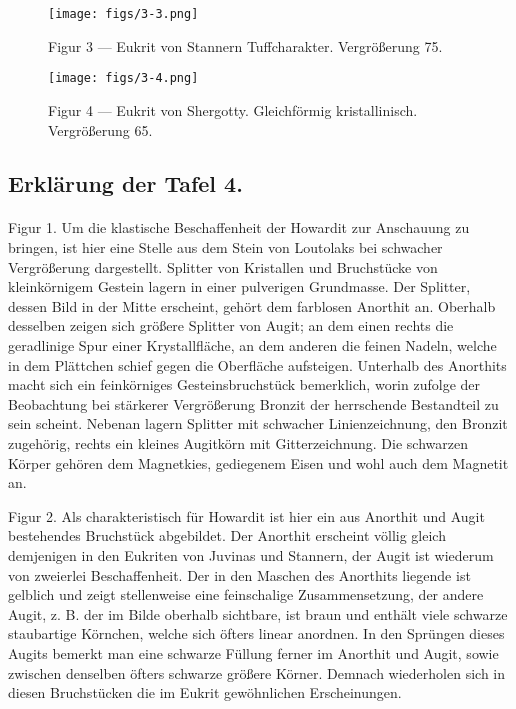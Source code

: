 \documentclass[a4paper, 12pt, oneside]{article}
\begin{document}
\vspace*{\fill}
\begin{figure}[H]
\centering
\texttt{[image: figs/3-3.png]}
\caption{\small Figur 3 --- Eukrit von Stannern Tuffcharakter. Vergrößerung 75.}
\end{figure}
\vspace*{\fill}
\clearpage

\vspace*{\fill}
\begin{figure}[H]
\centering
\texttt{[image: figs/3-4.png]}
\caption{\small Figur 4 --- Eukrit von Shergotty. Gleichförmig kristallinisch. Vergrößerung 65.}
\end{figure}
\vspace*{\fill}
\clearpage

\subsection{Erklärung der Tafel 4.}
\paragraph{}
Figur 1. Um die klastische Beschaffenheit der Howardit zur Anschauung zu bringen, ist hier eine Stelle aus dem Stein von Loutolaks bei schwacher Vergrößerung dargestellt. Splitter von Kristallen und Bruchstücke von kleinkörnigem Gestein lagern in einer pulverigen Grundmasse. Der Splitter, dessen Bild in der Mitte erscheint, gehört dem farblosen Anorthit an. Oberhalb desselben zeigen sich größere Splitter von Augit; an dem einen rechts die geradlinige Spur einer Krystallfläche, an dem anderen die feinen Nadeln, welche in dem Plättchen schief gegen die Oberfläche aufsteigen. Unterhalb des Anorthits macht sich ein feinkörniges Gesteinsbruchstück bemerklich, worin zufolge der Beobachtung bei stärkerer Vergrößerung Bronzit der herrschende Bestandteil zu sein scheint. Nebenan lagern Splitter mit schwacher Linienzeichnung, den Bronzit zugehörig, rechts ein kleines Augitkörn mit Gitterzeichnung. Die schwarzen Körper gehören dem Magnetkies, gediegenem Eisen und wohl auch dem Magnetit an.

Figur 2. Als charakteristisch für Howardit ist hier ein aus Anorthit und Augit bestehendes Bruchstück abgebildet. Der Anorthit erscheint völlig gleich demjenigen in den Eukriten von Juvinas und Stannern, der Augit ist wiederum von zweierlei Beschaffenheit. Der in den Maschen des Anorthits liegende ist gelblich und zeigt stellenweise eine feinschalige Zusammensetzung, der andere Augit, z. B. der im Bilde oberhalb sichtbare, ist braun und enthält viele schwarze staubartige Körnchen, welche sich öfters linear anordnen. In den Sprüngen dieses Augits bemerkt man eine schwarze Füllung ferner im Anorthit und Augit, sowie zwischen denselben öfters schwarze größere Körner. Demnach wiederholen sich in diesen Bruchstücken die im Eukrit gewöhnlichen Erscheinungen.
\end{document}
